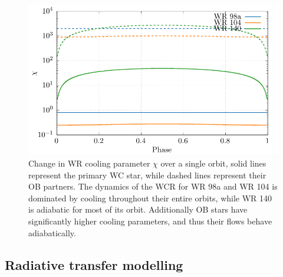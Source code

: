 \begin{figure}[h]
  \centering
  \includegraphics{assets/orbits/chi-vs-phase.pdf}
  \caption[$\chi$ change over system orbit]{Change in WR cooling parameter $\chi$ over a single orbit, solid lines represent the primary WC star, while dashed lines represent their OB partners. The dynamics of the WCR for WR 98a and WR 104 is dominated by cooling throughout their entire orbits, while WR 140 is adiabatic for most of its orbit. Additionally OB stars have significantly higher cooling parameters, and thus their flows behave adiabatically.}
  \label{fig:chiphase}
\end{figure}







\subsection{Radiative transfer modelling}
